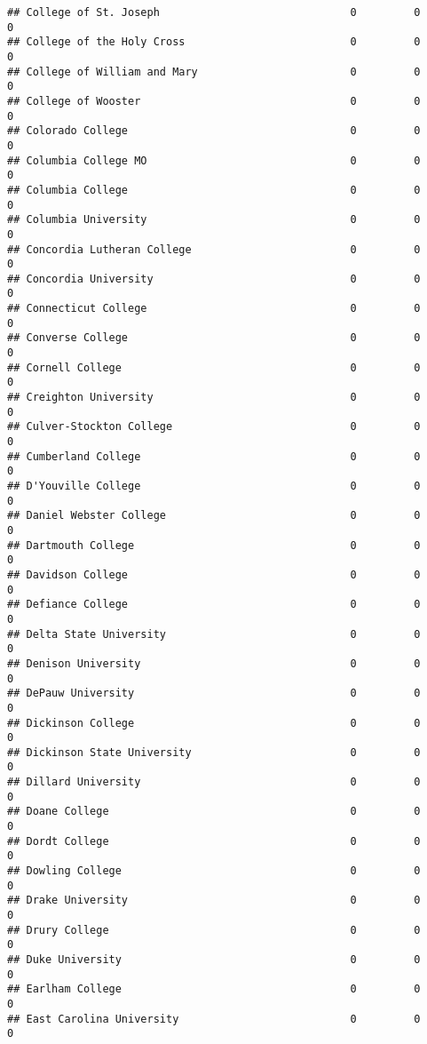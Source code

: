 \documentclass[
]{article}
\begin{document}
\begin{verbatim}
## College of St. Joseph                              0         0         0
## College of the Holy Cross                          0         0         0
## College of William and Mary                        0         0         0
## College of Wooster                                 0         0         0
## Colorado College                                   0         0         0
## Columbia College MO                                0         0         0
## Columbia College                                   0         0         0
## Columbia University                                0         0         0
## Concordia Lutheran College                         0         0         0
## Concordia University                               0         0         0
## Connecticut College                                0         0         0
## Converse College                                   0         0         0
## Cornell College                                    0         0         0
## Creighton University                               0         0         0
## Culver-Stockton College                            0         0         0
## Cumberland College                                 0         0         0
## D'Youville College                                 0         0         0
## Daniel Webster College                             0         0         0
## Dartmouth College                                  0         0         0
## Davidson College                                   0         0         0
## Defiance College                                   0         0         0
## Delta State University                             0         0         0
## Denison University                                 0         0         0
## DePauw University                                  0         0         0
## Dickinson College                                  0         0         0
## Dickinson State University                         0         0         0
## Dillard University                                 0         0         0
## Doane College                                      0         0         0
## Dordt College                                      0         0         0
## Dowling College                                    0         0         0
## Drake University                                   0         0         0
## Drury College                                      0         0         0
## Duke University                                    0         0         0
## Earlham College                                    0         0         0
## East Carolina University                           0         0         0

\end{verbatim}
\end{document}
